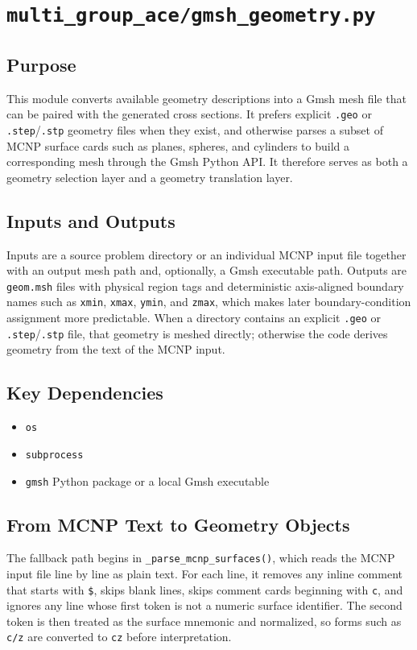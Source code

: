 \documentclass[11pt]{article}
\begin{document}
\section{\texttt{multi\_group\_ace/gmsh\_geometry.py}}

\subsection*{Purpose}
This module converts available geometry descriptions into a Gmsh mesh file that can be paired with the generated cross sections. It prefers explicit \texttt{.geo} or \texttt{.step}/\texttt{.stp} geometry files when they exist, and otherwise parses a subset of MCNP surface cards such as planes, spheres, and cylinders to build a corresponding mesh through the Gmsh Python API. It therefore serves as both a geometry selection layer and a geometry translation layer.

\subsection*{Inputs and Outputs}
Inputs are a source problem directory or an individual MCNP input file together with an output mesh path and, optionally, a Gmsh executable path. Outputs are \texttt{geom.msh} files with physical region tags and deterministic axis-aligned boundary names such as \texttt{xmin}, \texttt{xmax}, \texttt{ymin}, and \texttt{zmax}, which makes later boundary-condition assignment more predictable. When a directory contains an explicit \texttt{.geo} or \texttt{.step}/\texttt{.stp} file, that geometry is meshed directly; otherwise the code derives geometry from the text of the MCNP input.

\subsection*{Key Dependencies}
\begin{itemize}
\item \texttt{os}
\item \texttt{subprocess}
\item \texttt{gmsh} Python package or a local Gmsh executable
\end{itemize}

\subsection*{From MCNP Text to Geometry Objects}
The fallback path begins in \texttt{\_parse\_mcnp\_surfaces()}, which reads the MCNP input file line by line as plain text. For each line, it removes any inline comment that starts with \texttt{\$}, skips blank lines, skips comment cards beginning with \texttt{c}, and ignores any line whose first token is not a numeric surface identifier. The second token is then treated as the surface mnemonic and normalized, so forms such as \texttt{c/z} are converted to \texttt{cz} before interpretation.
\end{document}
